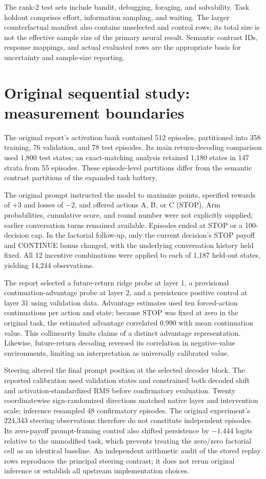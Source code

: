 \documentclass{article}
\begin{document}
The rank-2 test sets include bandit, debugging, foraging, and solvability. Task holdout comprises effort, information sampling, and waiting. The larger counterfactual manifest also contains unselected and control rows; its total size is not the effective sample size of the primary neural result. Semantic contrast IDs, response mappings, and actual evaluated rows are the appropriate basis for uncertainty and sample-size reporting.

\section{Original sequential study: measurement boundaries}
The original report's activation bank contained 512 episodes, partitioned into 358 training, 76 validation, and 78 test episodes. Its main return-decoding comparison used 1,800 test states; an exact-matching analysis retained 1,180 states in 147 strata from 55 episodes. These episode-level partitions differ from the semantic contrast partitions of the expanded task battery.

The original prompt instructed the model to maximize points, specified rewards of $+3$ and losses of $-2$, and offered actions A, B, or C (STOP). Arm probabilities, cumulative score, and round number were not explicitly supplied; earlier conversation turns remained available. Episodes ended at STOP or a 100-decision cap. In the factorial follow-up, only the current decision's STOP payoff and CONTINUE bonus changed, with the underlying conversation history held fixed. All 12 incentive combinations were applied to each of 1,187 held-out states, yielding 14,244 observations.

The report selected a future-return ridge probe at layer 1, a provisional continuation-advantage probe at layer 2, and a persistence positive control at layer 31 using validation data. Advantage estimates used ten forced-action continuations per action and state; because STOP was fixed at zero in the original task, the estimated advantage correlated 0.990 with mean continuation value. This collinearity limits claims of a distinct advantage representation. Likewise, future-return decoding reversed its correlation in negative-value environments, limiting an interpretation as universally calibrated value.

Steering altered the final prompt position at the selected decoder block. The reported calibration used validation states and constrained both decoded shift and activation-standardized RMS before confirmatory evaluation. Twenty coordinatewise sign-randomized directions matched native layer and intervention scale; inference resampled 48 confirmatory episodes. The original experiment's 224,343 steering observations therefore do not constitute independent episodes. Its zero-payoff prompt-framing control also shifted persistence by $-1.444$ logits relative to the unmodified task, which prevents treating the zero/zero factorial cell as an identical baseline. An independent arithmetic audit of the stored replay rows reproduces the principal steering contrast; it does not rerun original inference or establish all upstream implementation choices.
\end{document}

